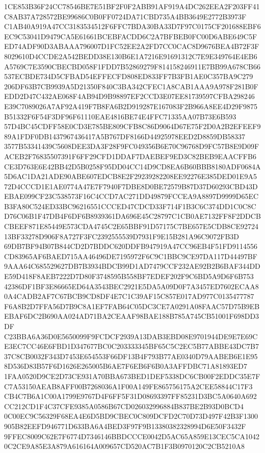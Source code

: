 \documentclass[UTF8,fontset=fandol,zihao=-4,a4paper]{ctexart}
\begin{document}
{{1CE853B36F24CC78546BE7E51BF2F0F2ABB91AF919A4DC262EEA2F203FF41C8AB37A728572BE99686C0B0FF0724DA71CBD735A4BB3649E2772B3973F
C1AB40A919A47CC3183534512F6FFC7BDA30BA33D7F97C0175CF201688EBF6EC9C53041D9479CA5E61661BCEBFACDD6C2A7BFBEB0FC00D6ABE649C5F
ED74ADF90D3ABAAA796007D1FC52EE2A2FD7CC0CAC8D9676BEA4B72F3F8029610D4CCDE2A542BEDD38E130B6E1A7216E91691312C7E9E349764E4EB6
A5769C7E3590CBECBD058F1FDD7B52869279F814158246911E7BB99A678CB66537ECBDE734D5CFBAD54EFFECFD808ED833FF7B3FB1AE0C357BA9C279
206DF63B7CB9939A5D21350F840C3BA342CFEC1A8CAB1AAA9A978F281B0FEDD2D47C432AE068F4AB94D9B98897EF2CCD3E07EE81739597CFBA298246
E39C7089026A7AF92A419F7B8FA6B2D919287E167083F2B966A8EE4D29F9875B51332F6F54F3DF96F61110EAE4816BE74E4FFC71335AA07B73E6B593
57D4BC45CDFF58E0CD3E785BE809CFB8C86D9064D67E75F2D0A2B2EFEEF989A1FDF0DB1437967436417A5B767DF8166D44925978EED2D8859DB58337
3577B53341439C5608DEE3DA3F28F9FC049356B6E70C96768D9FC57B8E9D09FACEB2F76835507391F6FF29CFD1DDAF7DAEBEF9ED3C82BEB9EAACFFB6
CE3D763E6E42BB42D5B0258F95DD04CC14D9CD8EA6B60BBB8180ADF0684A5D6AC1DA21ADE90ABE607EDCB8E2F29239282208EE92276E385DED01E9A5
72D4CCCD1E1AE0774A47E7F7940F7DBE8D0BE72579B87D37D60293CBD43DEBAE099CF23C538573F16C4CCD7AC271DD49879FCCEA9A8897D9999D65EC
B3FA80C524ED33BC96216551CCCED47CDCD33F714F1B3C6C374DD1C0C8CD76C06B1F47DB4F6DF6B8939361DA696E45C28797C1CB0AE7132FF8F2DDCB
CBEEF871E85449E573CDA4745C2E65BBF91D57175C7BE657E5CDB8CE9272413BF33278D906F8A727F3FC2392555539D7931F9E15B281A96C9072FB3D
69DB7BF94B07B844CD2D7BDDC620DDFB947919A47CC96EB4F51FD9114556CD83965AF6BAED715AA46496DE7195972F6C9C1BBC9CE97DA117D44497BF
9AAA64C685529627DB7B3934BDCB99D1AD7479CCF232AE92B2B6BAF344DDE59D418F8AEB7222D7D80F3748595B558BF7EDEF202F9C6BD5A9D6F6B753
42386DF1BF3E86665ED64A3543BEC2921E5DA5A09D0F7A3457ED7602ECAA80A4CADB2AF7C67BCB9CD8DF4E7C1C39AF15C857E017AD977C0135477787
F6A8B2D7FFA56D7B9C8A1EF7FAB64C05DC3CE7A0291A08FAAC57D75B9EBEBAF6DC2B690AA024AD71BA2CEAAF98BAE188B785A745CB51001F698DD3DF
C23BBA6A36D0E5650099F9FCDCF2939A13DAB3EBD08E9701944DE9E7E69CE3EC7CC46E6FBD1D347677BC0C203333345BF65C5C2EC5B77ABBE43DC7B7
37C8CB0032F343D7453E654553F66DF13B4F793B77AE0340D79AABEB6E1E958D536D83B57F6D1626E265005B6AE7F6EB6F6B0A3AFFDBC71A81893ED7
1FAA0520D9CE2D73CE931A70BBA673BED1DEF5338DC6CB00F2EDDC35E7FC7A53150AEAB8AFF00B7268036A1F00A149FE865756175A2CEE58844C17F3
CB4C7B6A1C00A1799E9767D4F6FF5F31D08693397FF85231D3BC5A0640A692CC212CD1F4C37CFE9385A0586B67CD026032996884B837BE2B93D0BCD4
0C00EC9C56329F68EA4E6D5BD9CBEC0C809DCFD2C70D73D497F42B3F1300905B82EEFD946771D633BA6A4BED3F97F9B13380382328994D6E50F3432F
9FFEC8009C62E7F6774D7346146BBDCCCE0042D5AC65A859E13CEC5CA10420C2CE9A85E3A879A616164A009657CD520AC7B1F3B0970120C2CB5210A8
}}
\end{document}
